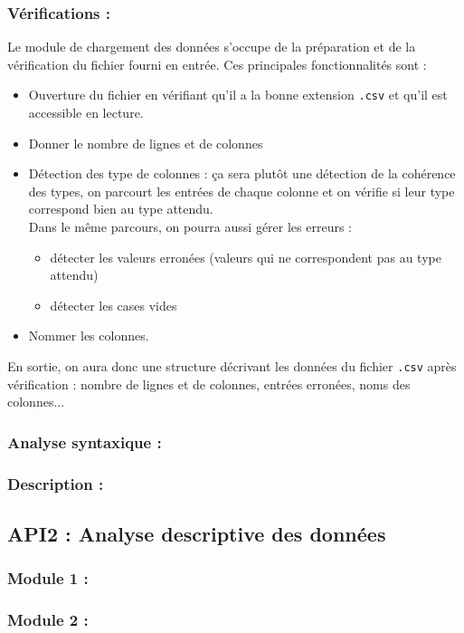 			\subsubsection{Vérifications :}
				Le module de chargement des données s'occupe de la préparation et de la vérification du fichier fourni en entrée. Ces principales fonctionnalités sont :
				\begin{itemize}
				\item Ouverture du fichier en vérifiant qu'il a la bonne extension \lstinline!.csv! et qu'il est accessible en lecture.
				\item Donner le nombre de lignes et de colonnes
				\item Détection des type de colonnes : ça sera plutôt une détection de la cohérence des types, on parcourt les entrées de chaque colonne et on vérifie si leur type correspond bien au type attendu.\\
				Dans le même parcours, on pourra aussi gérer les erreurs :
					\begin{itemize}
					\item détecter les valeurs erronées (valeurs qui ne correspondent pas au type attendu)
					\item détecter les cases vides
					\end{itemize}
				\item Nommer les colonnes.
				\end{itemize}
				En sortie, on aura donc une structure décrivant les données du fichier \lstinline!.csv! après vérification : nombre de lignes et de colonnes, entrées erronées, noms des colonnes...
			\subsubsection{Analyse syntaxique :}
			
			\subsubsection{Description :}
				
		\subsection{API2 : Analyse descriptive des données}
				\subsubsection{Module 1 :}
				\subsubsection{Module 2 :}
